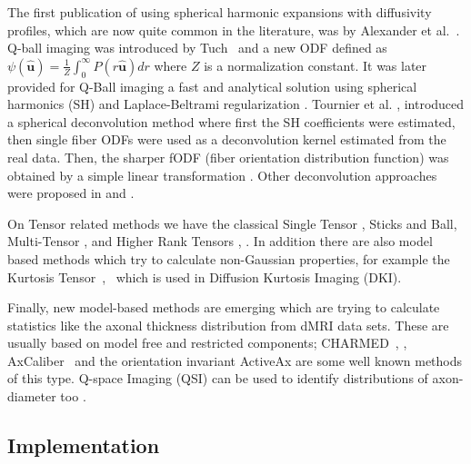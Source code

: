 \documentclass{bioinfo}
\begin{document}
\begin{methods}
%
The first publication of using spherical harmonic expansions with
diffusivity profiles, which are now quite common in the literature,
was by Alexander et al.~\cite{alexander2002detection}. Q-ball imaging
was introduced by Tuch~\cite{Tuch2004} and a new ODF defined as
$\psi(\mathbf{\hat{u}})=\frac{1}{Z}\int_{0}^{\infty}P(r\mathbf{\hat{u}})dr$
where $Z$ is a normalization constant. It was later provided for
Q-Ball imaging a fast and analytical solution using spherical harmonics
(SH) and Laplace-Beltrami regularization \cite{Descoteaux2007}. Tournier
et al. \cite{tournier2004direct}, \cite{Tournier2007} introduced
a spherical deconvolution method where first the SH coefficients were
estimated, then single fiber ODFs were used as a deconvolution kernel
estimated from the real data. Then, the sharper fODF (fiber orientation
distribution function) was obtained by a simple linear transformation
\cite{descoteaux2007deterministic}. Other deconvolution approaches
were proposed in \cite{sakaie2007objective} and \cite{yeh2011estimation}.

On Tensor related methods we have the classical Single Tensor \cite{Basser1994},
Sticks and Ball\cite{Behrens2007NeuroImage}, Multi-Tensor \cite{pasternak2008variational},
\cite{liu2004characterizing} and Higher Rank Tensors \cite{ozarslan2003generalized},
\cite{barmpoutis2009regularized}. In addition there are also model
based methods which try to calculate non-Gaussian properties, for
example the Kurtosis Tensor~\cite{jensen2005diffusional},~\cite{lu2006three}
which is used in Diffusion Kurtosis Imaging (DKI).

Finally, new model-based methods are emerging which are trying to
calculate statistics like the axonal thickness distribution from dMRI
data sets. These are usually based on model free and restricted components;
CHARMED~\cite{assaf2005composite}, \cite{assaf2004new}, AxCaliber~\cite{assaf2008axcaliber}
and the orientation invariant ActiveAx \cite{alexander2010orientationally}
are some well known methods of this type. Q-space Imaging (QSI) can
be used to identify distributions of axon-diameter too \cite{ong2010quantifying}.


\subsection{Implementation }


\end{methods}
\end{document}
